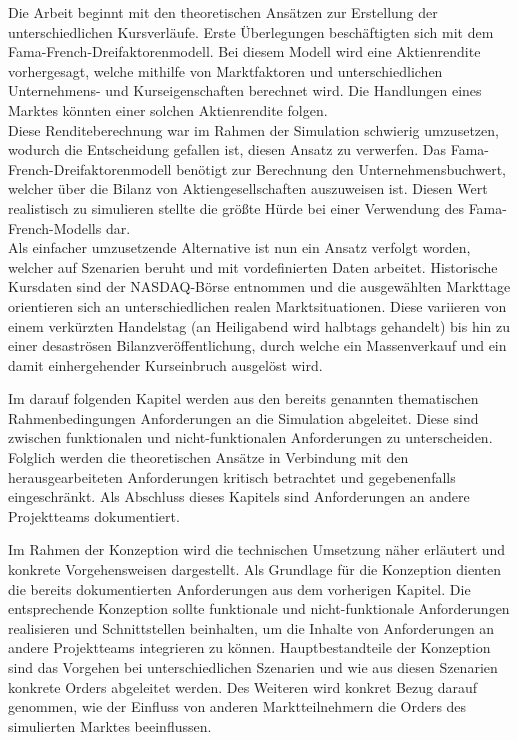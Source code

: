 	
	Die Arbeit beginnt mit den theoretischen Ansätzen zur Erstellung der unterschiedlichen Kursverläufe. Erste Überlegungen beschäftigten sich mit dem Fama-French-Dreifaktorenmodell. Bei diesem Modell wird eine Aktienrendite vorhergesagt, welche mithilfe von Marktfaktoren und unterschiedlichen Unternehmens- und Kurseigenschaften berechnet wird. Die Handlungen eines Marktes könnten einer solchen Aktienrendite folgen.\\
	Diese Renditeberechnung war im Rahmen der Simulation schwierig umzusetzen, wodurch die Entscheidung gefallen ist, diesen Ansatz zu verwerfen. Das Fama-French-Dreifaktorenmodell benötigt zur Berechnung den Unternehmensbuchwert, welcher über die Bilanz von Aktiengesellschaften auszuweisen ist. Diesen Wert realistisch zu simulieren stellte die größte Hürde bei einer Verwendung des Fama-French-Modells dar. \\
	Als einfacher umzusetzende Alternative ist nun ein Ansatz verfolgt worden, welcher auf Szenarien beruht und mit vordefinierten Daten arbeitet. Historische Kursdaten sind der NASDAQ-Börse entnommen und die ausgewählten Markttage orientieren sich an unterschiedlichen realen Marktsituationen. Diese variieren von einem verkürzten Handelstag (an Heiligabend wird halbtags gehandelt) bis hin zu einer desaströsen Bilanzveröffentlichung, durch welche ein Massenverkauf und ein damit einhergehender Kurseinbruch ausgelöst wird.
	
	
	Im darauf folgenden Kapitel werden aus den bereits genannten thematischen Rahmenbedingungen Anforderungen an die Simulation abgeleitet. Diese sind zwischen funktionalen und nicht-funktionalen Anforderungen zu unterscheiden. Folglich werden die theoretischen Ansätze in Verbindung mit den herausgearbeiteten Anforderungen kritisch betrachtet und gegebenenfalls eingeschränkt. Als Abschluss dieses Kapitels sind Anforderungen an andere Projektteams dokumentiert.
	
	
	Im Rahmen der Konzeption wird die technischen Umsetzung näher erläutert und konkrete Vorgehensweisen dargestellt. Als Grundlage für die Konzeption dienten die bereits dokumentierten Anforderungen aus dem vorherigen Kapitel. Die entsprechende Konzeption sollte funktionale und nicht-funktionale Anforderungen realisieren und Schnittstellen beinhalten, um die Inhalte von Anforderungen an andere Projektteams integrieren zu können. Hauptbestandteile der Konzeption sind das Vorgehen bei unterschiedlichen Szenarien und wie aus diesen Szenarien konkrete Orders abgeleitet werden. Des Weiteren wird konkret Bezug darauf genommen, wie der Einfluss von anderen Marktteilnehmern die Orders des simulierten Marktes beeinflussen.
	

